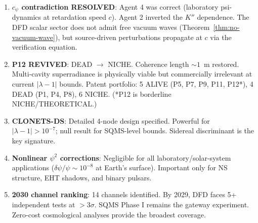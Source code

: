 \documentclass[11pt]{article}
\begin{document}
\begin{tcolorbox}[colback=green!5!white, colframe=green!60!black,
  title=\textbf{Programme Impact of W4i17 Findings}]

\begin{enumerate}[nosep]

\item \textbf{$c_\psi$ contradiction RESOLVED}: Agent 4 was correct
  (laboratory psi-dynamics at retardation speed $c$). Agent 2 inverted
  the $K''$ dependence. The DFD scalar sector does not admit free
  vacuum waves (Theorem~\ref{thm:no-vacuum-wave}), but source-driven
  perturbations propagate at $c$ via the verification equation.

\item \textbf{P12 REVIVED}: DEAD $\to$ NICHE. Coherence length
  $\sim 1$~m restored. Multi-cavity superradiance is physically viable
  but commercially irrelevant at current $|\lambda - 1|$ bounds.
  Patent portfolio: 5 ALIVE (P5, P7, P9, P11, P12*), 4 DEAD (P1, P4, P8),
  6 NICHE. (*P12 is borderline NICHE/THEORETICAL.)

\item \textbf{CLONETS-DS}: Detailed 4-node design specified. Powerful
  for $|\lambda - 1| > 10^{-7}$; null result for SQMS-level bounds.
  Sidereal discriminant is the key signature.

\item \textbf{Nonlinear $\psi^2$ corrections}: Negligible for all
  laboratory/solar-system applications ($\delta\psi/\psi \sim 10^{-8}$
  at Earth's surface). Important only for NS structure, EHT shadows,
  and binary pulsars.

\item \textbf{2030 channel ranking}: 14 channels identified. By 2029,
  DFD faces 5+ independent tests at $>3\sigma$. SQMS Phase I remains
  the gateway experiment. Zero-cost cosmological analyses provide the
  broadest coverage.

\end{enumerate}
\end{tcolorbox}
\end{document}

